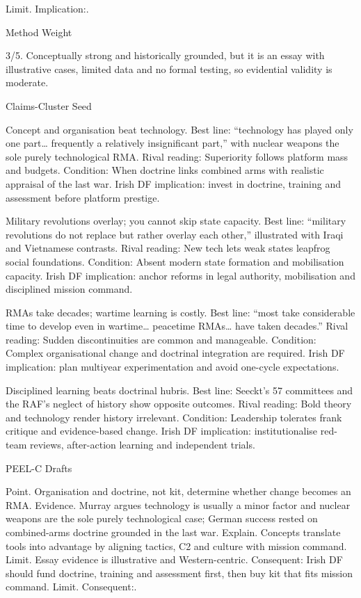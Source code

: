 Limit. Implication:.

Method Weight

3/5. Conceptually strong and historically grounded, but it is an essay with illustrative cases, limited data and no formal testing, so evidential validity is moderate.

Claims-Cluster Seed

Concept and organisation beat technology.
Best line: “technology has played only one part… frequently a relatively insignificant part,” with nuclear weapons the sole purely technological RMA.
Rival reading: Superiority follows platform mass and budgets.
Condition: When doctrine links combined arms with realistic appraisal of the last war.
Irish DF implication: invest in doctrine, training and assessment before platform prestige.

Military revolutions overlay; you cannot skip state capacity.
Best line: “military revolutions do not replace but rather overlay each other,” illustrated with Iraqi and Vietnamese contrasts.
Rival reading: New tech lets weak states leapfrog social foundations.
Condition: Absent modern state formation and mobilisation capacity.
Irish DF implication: anchor reforms in legal authority, mobilisation and disciplined mission command.

RMAs take decades; wartime learning is costly.
Best line: “most take considerable time to develop even in wartime… peacetime RMAs… have taken decades.”
Rival reading: Sudden discontinuities are common and manageable.
Condition: Complex organisational change and doctrinal integration are required.
Irish DF implication: plan multiyear experimentation and avoid one-cycle expectations.

Disciplined learning beats doctrinal hubris.
Best line: Seeckt’s 57 committees and the RAF’s neglect of history show opposite outcomes.
Rival reading: Bold theory and technology render history irrelevant.
Condition: Leadership tolerates frank critique and evidence-based change.
Irish DF implication: institutionalise red-team reviews, after-action learning and independent trials.

PEEL-C Drafts

Point. Organisation and doctrine, not kit, determine whether change becomes an RMA.
Evidence. Murray argues technology is usually a minor factor and nuclear weapons are the sole purely technological case; German success rested on combined-arms doctrine grounded in the last war.
Explain. Concepts translate tools into advantage by aligning tactics, C2 and culture with mission command.
Limit. Essay evidence is illustrative and Western-centric. Consequent: Irish DF should fund doctrine, training and assessment first, then buy kit that fits mission command. Limit. Consequent:.

